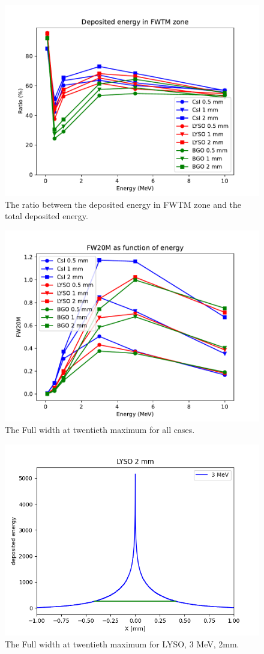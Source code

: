 \documentclass{article}
\begin{document}
\begin{figure}[H]
    \centering
    \includegraphics[width=0.8\linewidth]{images/task6/dep_ten.pdf}
    \caption{The ratio between the deposited energy in FWTM zone and the total deposited energy.}
\end{figure}

 \begin{figure}[H]
    \centering
    \includegraphics[width=0.8\linewidth]{images/task6/FW20M_all.pdf}
    \caption{The Full width at twentieth maximum for all cases. }
\end{figure}

 \begin{figure}[H]
    \centering
    \includegraphics[width=0.8\linewidth]{images/task6/Figure_1.png}
    \caption{The Full width at twentieth maximum for LYSO, 3 MeV, 2mm. }
\end{figure}
\end{document}
